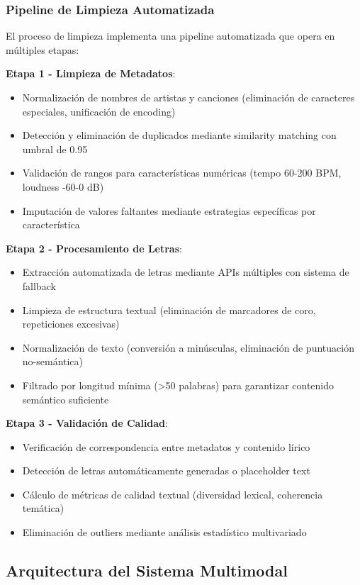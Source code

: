 \documentclass[12pt,a4paper]{article}
\begin{document}
\subsubsection{Pipeline de Limpieza Automatizada}

El proceso de limpieza implementa una pipeline automatizada que opera en múltiples etapas:

\textbf{Etapa 1 - Limpieza de Metadatos}:
\begin{itemize}
    \item Normalización de nombres de artistas y canciones (eliminación de caracteres especiales, unificación de encoding)
    \item Detección y eliminación de duplicados mediante similarity matching con umbral de 0.95
    \item Validación de rangos para características numéricas (tempo 60-200 BPM, loudness -60-0 dB)
    \item Imputación de valores faltantes mediante estrategias específicas por característica
\end{itemize}

\textbf{Etapa 2 - Procesamiento de Letras}:
\begin{itemize}
    \item Extracción automatizada de letras mediante APIs múltiples con sistema de fallback
    \item Limpieza de estructura textual (eliminación de marcadores de coro, repeticiones excesivas)
    \item Normalización de texto (conversión a minúsculas, eliminación de puntuación no-semántica)
    \item Filtrado por longitud mínima (>50 palabras) para garantizar contenido semántico suficiente
\end{itemize}

\textbf{Etapa 3 - Validación de Calidad}:
\begin{itemize}
    \item Verificación de correspondencia entre metadatos y contenido lírico
    \item Detección de letras automáticamente generadas o placeholder text
    \item Cálculo de métricas de calidad textual (diversidad lexical, coherencia temática)
    \item Eliminación de outliers mediante análisis estadístico multivariado
\end{itemize}

\subsection{Arquitectura del Sistema Multimodal}
\end{document}
